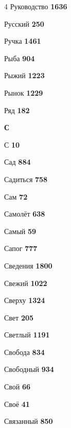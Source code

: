 \begin{multicols}{4}
\noindent Руководство \dotfill \textbf{\color{secondary} 1636}\par
\noindent Русский \dotfill \textbf{\color{secondary} 250}\par
\noindent Ручка \dotfill \textbf{\color{secondary} 1461}\par
\noindent Рыба \dotfill \textbf{\color{secondary} 904}\par
\noindent Рыжий \dotfill \textbf{\color{secondary} 1223}\par
\noindent Рынок \dotfill \textbf{\color{secondary} 1229}\par
\noindent Ряд \dotfill \textbf{\color{secondary} 182}\par

\vspace{0.6em}\noindent\textbf{\normalsize\sffamily\color{primary} С}\par\vspace{0.2em}
\noindent С \dotfill \textbf{\color{secondary} 10}\par
\noindent Сад \dotfill \textbf{\color{secondary} 884}\par
\noindent Садиться \dotfill \textbf{\color{secondary} 758}\par
\noindent Сам \dotfill \textbf{\color{secondary} 72}\par
\noindent Самолёт \dotfill \textbf{\color{secondary} 638}\par
\noindent Самый \dotfill \textbf{\color{secondary} 59}\par
\noindent Сапог \dotfill \textbf{\color{secondary} 777}\par
\noindent Сведения \dotfill \textbf{\color{secondary} 1800}\par
\noindent Свежий \dotfill \textbf{\color{secondary} 1022}\par
\noindent Сверху \dotfill \textbf{\color{secondary} 1324}\par
\noindent Свет \dotfill \textbf{\color{secondary} 205}\par
\noindent Светлый \dotfill \textbf{\color{secondary} 1191}\par
\noindent Свобода \dotfill \textbf{\color{secondary} 834}\par
\noindent Свободный \dotfill \textbf{\color{secondary} 934}\par
\noindent Свой \dotfill \textbf{\color{secondary} 66}\par
\noindent Своё \dotfill \textbf{\color{secondary} 41}\par
\noindent Связанный \dotfill \textbf{\color{secondary} 850}\par

\end{multicols}
